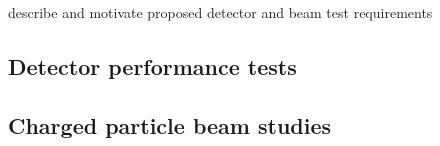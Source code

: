 describe and motivate proposed detector and beam test requirements 

\subsection{Detector performance tests}

\subsection{Charged particle beam studies}

